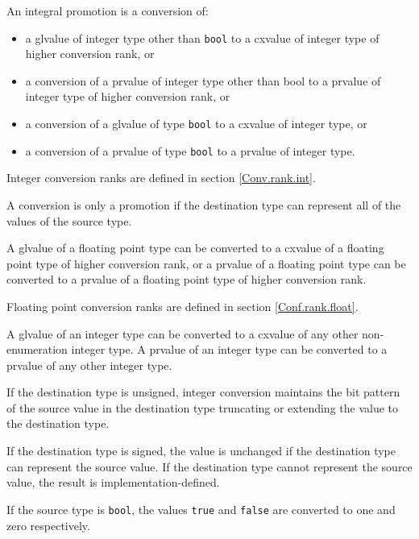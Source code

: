 
\p An integral promotion is a conversion of:
\begin{itemize}
  \item a glvalue of integer type other than \texttt{bool} to a cxvalue of
  integer type of higher conversion rank, or
  \item a conversion of a prvalue of integer type other than bool to a prvalue
  of integer type of higher conversion rank, or
  \item a conversion of a glvalue of type \texttt{bool} to a cxvalue of integer
  type, or
  \item a conversion of a prvalue of type \texttt{bool} to a prvalue of integer
  type.
\end{itemize}

\p Integer conversion ranks are defined in section \ref{Conv.rank.int}.

\p A conversion is only a promotion if the destination type can represent all of
the values of the source type.


\p A glvalue of a floating point type can be converted to a cxvalue of a
floating point type of higher conversion rank, or a prvalue of a floating point
type can be converted to a prvalue of a floating point type of higher conversion
rank.

\p Floating point conversion ranks are defined in section \ref{Conf.rank.float}.


\p A glvalue of an integer type can be converted to a cxvalue of any other
non-enumeration integer type. A prvalue of an integer type can be converted to a
prvalue of any other integer type.

\p If the destination type is unsigned, integer conversion maintains the bit pattern
of the source value in the destination type truncating or extending the value to
the destination type.

\p If the destination type is signed, the value is unchanged if the destination
type can represent the source value. If the destination type cannot represent
the source value, the result is implementation-defined.

\p If the source type is \texttt{bool}, the values \texttt{true} and
\texttt{false} are converted to one and zero respectively.


